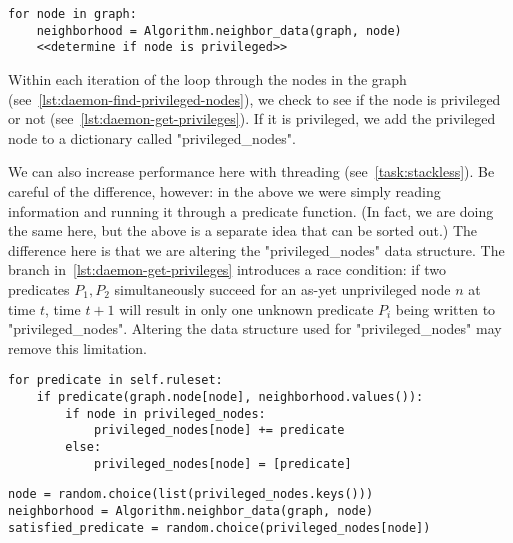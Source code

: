 \begin{lstlisting}[float=p, caption={Finding privileged nodes.}, label={lst:daemon-find-privileged-nodes}]
for node in graph:
    neighborhood = Algorithm.neighbor_data(graph, node)
    <<determine if node is privileged>>
\end{lstlisting}

Within each iteration of the loop through the nodes in the graph
  (see~\autoref{lst:daemon-find-privileged-nodes}),
  we check to see if the node is privileged or not
  (see~\autoref{lst:daemon-get-privileges}).
If it is privileged, we add the privileged node to a dictionary called "privileged_nodes".
\begin{warning}
  We can also increase performance here with threading (see~\autoref{task:stackless}).
  Be careful of the difference, however:
    in the above we were simply reading information and
    running it through a predicate function.
  (In fact, we are doing the same here,
    but the above is a separate idea that can be sorted out.)
  The difference here is that we are altering the "privileged_nodes" data structure.
  The branch in~\autoref{lst:daemon-get-privileges} introduces a race condition:
    if two predicates $P_1, P_2$ simultaneously succeed for
    an as-yet unprivileged node $n$ at time $t$,
    time $t+1$ will result in only one unknown predicate
    $P_i$ being written to "privileged_nodes".
  Altering the data structure used for "privileged_nodes" may remove this limitation.
\end{warning}

\begin{lstlisting}[float=p, caption={Getting the privileges of a single node.}, label={lst:daemon-get-privileges}]
for predicate in self.ruleset:
    if predicate(graph.node[node], neighborhood.values()):
        if node in privileged_nodes:
            privileged_nodes[node] += predicate
        else:
            privileged_nodes[node] = [predicate]
\end{lstlisting}

\begin{lstlisting}[float=p, caption={Picking a random, satisfied predicate.}, label={lst:daemon-pick-predicate}]
node = random.choice(list(privileged_nodes.keys()))
neighborhood = Algorithm.neighbor_data(graph, node)
satisfied_predicate = random.choice(privileged_nodes[node])
\end{lstlisting}

